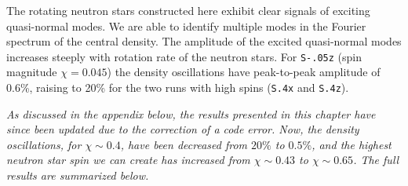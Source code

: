 The rotating neutron stars constructed here exhibit clear signals of
exciting quasi-normal modes. We are able to identify multiple modes
in the Fourier spectrum of the central density. The amplitude of the
excited quasi-normal modes increases steeply with rotation rate of the
neutron stars. For {\tt S-.05z} (spin magnitude $\chi=0.045$) the density
oscillations have peak-to-peak amplitude of 0.6\%, raising to 20\% for
the two runs with high spins ({\tt S.4x} and {\tt S.4z}).

{\it As discussed in the appendix below, the results presented in this chapter have since been updated due to the correction of a code error. Now, the density oscillations, for $\chi\sim 0.4$, have been decreased from $20\%$ to $0.5\%$, and the highest neutron star spin we can create has increased from $\chi\sim 0.43$ to $\chi\sim 0.65$. The full results are summarized below.}

%

